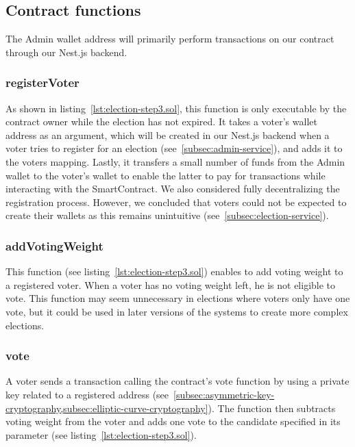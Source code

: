 \subsection{Contract functions}\label{subsec:contract-functions}

The \gls{Admin} wallet address will primarily perform transactions on our contract through our Nest.js backend.


\subsubsection{registerVoter}

As shown in listing~\ref{lst:election-step3.sol}, this function is only executable by the contract owner while the election has not expired.
It takes a voter’s wallet address as an argument, which will be created in our Nest.js backend when a voter tries to register for an election (see~\cref{subsec:admin-service}), and adds it to the voters mapping.
Lastly, it transfers a small number of funds from the \gls{Admin} wallet to the voter’s wallet to enable the latter to pay for transactions while interacting with the \gls{SmartContract}.
We also considered fully decentralizing the registration process.
However, we concluded that voters could not be expected to create their wallets as this remains unintuitive (see~\cref{subsec:election-service}).

\subsubsection{addVotingWeight}

This function (see listing~\ref{lst:election-step3.sol}) enables  to add voting weight to a registered voter.
When a voter has no voting weight left, he is not eligible to vote.
This function may seem unnecessary in elections where voters only have one vote, but it could be used in later versions of the systems to create more complex elections.

\subsubsection{vote}

A voter sends a transaction calling the contract's vote function by using a private key related to a registered address (see~\cref{subsec:asymmetric-key-cryptography,subsec:elliptic-curve-cryptography}).
The function then subtracts voting weight from the voter and adds one vote to the candidate specified in its parameter (see listing~\ref{lst:election-step3.sol}).

